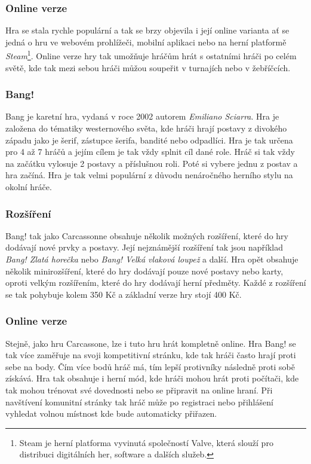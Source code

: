 \subsubsection*{Online verze}
Hra se stala rychle populární a tak se brzy objevila i její online varianta ať se jedná o hru ve webovém prohlížeči, mobilní aplikaci nebo na herní platformě \textit{Steam}\footnote{Steam je herní platforma vyvinutá společností Valve, která slouží pro distribuci digitálních her, software a dalších služeb.}. Online verze hry tak umožňuje hráčům hrát s ostatními hráči po celém světě, kde tak mezi sebou hráči můžou soupeřit v turnajích nebo v žebříčcích.

\subsubsection{Bang!}
\label{subsubsec:popular-board-games-analysis-bang}
Bang je karetní hra, vydaná v roce 2002 autorem \textit{Emiliano Sciarra}. Hra je založena do tématiky westernového světa, kde hráči hrají postavy z divokého západu jako je šerif, zástupce šerifa, bandité nebo odpadlíci. Hra je tak určena pro 4 až 7 hráčů a jejím cílem je tak vždy splnit cíl dané role. Hráč si tak vždy na začátku vylosuje 2 postavy a příslušnou roli. Poté si vybere jednu z postav a hra začíná. Hra je tak velmi populární z důvodu nenáročného herního stylu na okolní hráče.

\subsubsection*{Rozšíření}
\label{subsubsec:popular-board-games-analysis-bang-expansions}
Bang! tak jako Carcassonne obsahuje několik možných rozšíření, které do hry dodávají nové prvky a postavy. Její nejznámější rozšíření tak jsou například \textit{Bang! Zlatá horečka} nebo \textit{Bang! Velká vlaková loupež} a další. Hra opět obsahuje několik minirozšíření, které do hry dodávají pouze nové postavy nebo karty, oproti velkým rozšířením, které do hry dodávají herní předměty. Každé z rozšíření se tak pohybuje kolem 350 Kč a základní verze hry stojí 400 Kč.

\subsubsection*{Online verze}
Stejně, jako hru Carcassone, lze i tuto hru hrát kompletně online. Hra Bang! se tak více zaměřuje na svoji kompetitivní stránku, kde tak hráči často hrají proti sebe na body. Čím více bodů hráč má, tím lepší protivníky následně proti sobě získává. Hra tak obsahuje i herní mód, kde hráči mohou hrát proti počítači, kde tak mohou trénovat své dovednosti nebo se připravit na online hraní. Při navštívení komunitní stránky tak hráč může po registraci nebo přihlášení vyhledat volnou místnost kde bude automaticky přiřazen.

